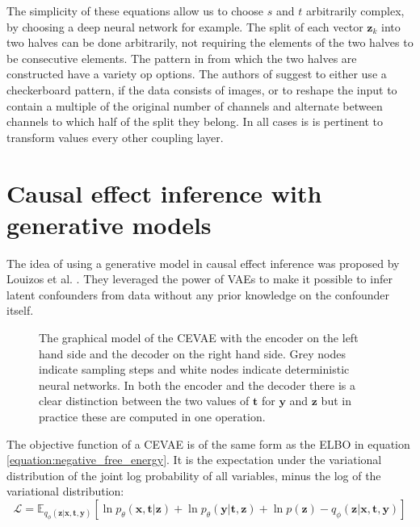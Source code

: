 \documentclass{report}
\newcommand{\E}{\mathbb{E}}
\newcommand{\bt}{\mathbf{t}}
\newcommand{\bx}{\mathbf{x}}
\newcommand{\by}{\mathbf{y}}
\newcommand{\bz}{\mathbf{z}}
\begin{document}
The simplicity of these equations allow us to choose $s$ and $t$ arbitrarily complex, by choosing a deep neural network for example. The split of each vector $\bz_k$ into two halves can be done arbitrarily, not requiring the elements of the two halves to be consecutive elements. The pattern in from which the two halves are constructed have a variety op options. The authors of \cite{dinh2016density} suggest to  either use a checkerboard pattern, if the data consists of images, or to reshape the input to contain a multiple of the original number of channels and alternate between channels to which half of the split they belong. In all cases is is pertinent to transform values every other coupling layer.




\chapter{Causal effect inference with generative models}
The idea of using a generative model in causal effect inference was proposed by Louizos et al. \cite{louizos2017causal}. They leveraged the power of VAEs to make it possible to infer latent confounders from data without any prior knowledge on the confounder itself.

\begin{figure}
    \centering

    
    \caption{The graphical model of the CEVAE with the encoder on the left hand side and the decoder on the right hand side. Grey nodes indicate sampling steps and white nodes indicate deterministic neural networks. In both the encoder and the decoder there is a clear distinction between the two values of $\bt$ for $\by$ and $\bz$ but in practice these are computed in one operation.}%
    \label{fig:cevae_graphical_model}
\end{figure}

The objective function of a CEVAE is of the same form as the ELBO in equation  \ref{equation:negative_free_energy}. It is the expectation under the variational distribution of the joint log probability of all variables, minus the log of the variational distribution:
\begin{equation}
    \mathcal{L} = \E_{q_\phi(\bz|\bx, \bt, \by)}[\ln p_\theta(\bx, \bt | \bz) + \ln p_\theta(\by |\bt, \bz) +\ln p(\bz) - q_\phi(\bz | \bx, \bt, \by)]
\end{equation}
\end{document}
